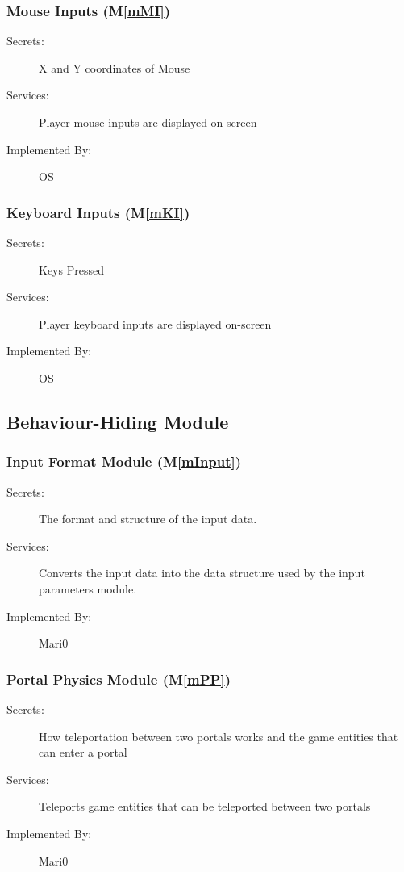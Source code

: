 \documentclass[12pt, titlepage]{article}
\newcommand{\mref}[1]{M\ref{#1}}
\begin{document}
\subsubsection{Mouse Inputs (\mref{mMI})}

\begin{description}
\item[Secrets:] X and Y coordinates of Mouse
\item[Services:] Player mouse inputs are displayed on-screen 
\item[Implemented By:] OS
\end{description}

\subsubsection{Keyboard Inputs (\mref{mKI})}

\begin{description}
\item[Secrets:] Keys Pressed
\item[Services:] Player keyboard inputs are displayed on-screen 
\item[Implemented By:] OS
\end{description}



\subsection{Behaviour-Hiding Module}

\subsubsection{Input Format Module (\mref{mInput})}

\begin{description}
\item[Secrets:]The format and structure of the input data.
\item[Services:]Converts the input data into the data structure used by the
  input parameters module.
\item[Implemented By:] Mari0
\end{description}

\subsubsection{Portal Physics Module (\mref{mPP})}
\begin{description}
\item[Secrets:] How teleportation between two portals works and the game entities that can enter a portal
\item[Services:] Teleports game entities that can be teleported between two portals
\item[Implemented By:] Mari0
\end{description}
\end{document}
